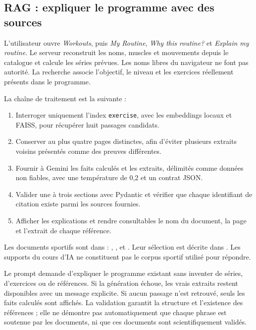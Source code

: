\documentclass[11pt,a4paper]{article}
\begin{document}
\clearpage
\subsection{RAG : expliquer le programme avec des sources}
L'utilisateur ouvre \textit{Workouts}, puis \textit{My Routine}, \textit{Why this routine?} et \textit{Explain my routine}. Le serveur reconstruit les noms, muscles et mouvements depuis le catalogue et calcule les séries prévues. Les noms libres du navigateur ne font pas autorité. La recherche associe l'objectif, le niveau et les exercices réellement présents dans le programme.

La chaîne de traitement est la suivante :
\begin{enumerate}[leftmargin=*,itemsep=0.35em]
\item Interroger uniquement l'index \texttt{exercise}, avec les embeddings locaux et FAISS, pour récupérer huit passages candidats.
\item Conserver au plus quatre pages distinctes, afin d'éviter plusieurs extraits voisins présentés comme des preuves différentes.
\item Fournir à Gemini les faits calculés et les extraits, délimités comme données non fiables, avec une température de 0,2 et un contrat JSON.
\item Valider une à trois sections avec Pydantic et vérifier que chaque identifiant de citation existe parmi les sources fournies.
\item Afficher les explications et rendre consultables le nom du document, la page et l'extrait de chaque référence.
\end{enumerate}

Les documents sportifs sont dans  : , ,  et . Leur sélection est décrite dans . Les supports du cours d'IA ne constituent pas le corpus sportif utilisé pour répondre.

Le prompt demande d'expliquer le programme existant sans inventer de séries, d'exercices ou de références. Si la génération échoue, les vrais extraits restent disponibles avec un message explicite. Si aucun passage n'est retrouvé, seuls les faits calculés sont affichés. La validation garantit la structure et l'existence des références ; elle ne démontre pas automatiquement que chaque phrase est soutenue par les documents, ni que ces documents sont scientifiquement validés.
\end{document}
